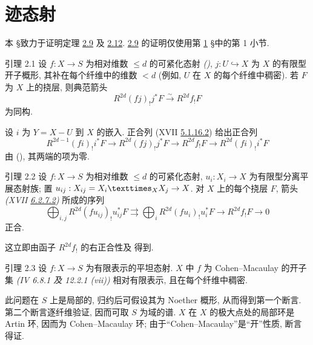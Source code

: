 \section{迹态射}\pageoriginale

本 \S 致力于证明定理 \hyperref[XVIII.thm2.9]{2.9} 及 \hyperref[XVIII.prop2.12]{2.12}. \hyperref[XVIII.thm2.9]{2.9} 的证明仅使用第 \hyperref[XVIII.sec1]{1} \S 中的第 1 小节.

\begin{enonce*}{引理 2.1}
设 $f:X\rightarrow S$ 为相对维数 $\leq d$ 的可紧化态射 \emph{()}, $j:U\hookrightarrow X$ 为 $X$ 的有限型开子概形, 其补在每个纤维中的维数 $< d$ (例如, $U$ 在 $X$ 的每个纤维中稠密). 若 $F$ 为 $X$ 上的挠层, 则典范箭头
$$
R^{2d}(fj)_{!}j^{\ast}F\xrightarrow{\sim} R^{2d}f_{!}F
$$
为同构.
\end{enonce*}

设 $i$ 为 $Y=X-U$ 到 $X$ 的嵌入. 正合列 (XVII \hyperref[XVII.eq5.1.16.2]{5.1.16.2}) 给出正合列
$$
R^{2d-1}(fi)_{!}i^{\ast}F\longrightarrow
R^{2d}(fj)_{!}j^{\ast}F\longrightarrow R^{2d}f_{!}F\longrightarrow
R^{2d}(fi)_{!}i^{\ast}F
$$
由 (), 其两端的项为零.

\begin{enonce*}{引理 2.2}
设 $f:X\rightarrow S$ 为相对维数 $\leq d$ 的可紧化态射, $u_{i}:X_{i}\rightarrow X$ 为有限型分离平展态射族; 置 $u_{ij}:X_{ij}=\fprod{X_{i}}{X_{j}}{X}\rightarrow X$. 对 $X$ 上的每个挠层 $F$, 箭头 \emph{(XVII \hyperref[XVII.eq6.2.7.2]{6.2.7.2})} 所成的序列
$$
\bigoplus_{i,j} R^{2d}(fu_{ij})_{!}u^{\ast}_{ij}F\rightrightarrows
\bigoplus_{i} R^{2d}(fu_{i})_{!}u^{\ast}_{i}F\rightarrow
R^{2d}f_{!}F\rightarrow 0
$$
正合.
\end{enonce*}

这立即由函子 $R^{2d}f_{!}$ 的右正合性及  得到.

\begin{enonce*}{引理 2.3}
设 $f:X\rightarrow S$ 为有限表示的平坦态射. $X$ 中 $f$ 为 Cohen--Macaulay 的开子集 \emph{(\EGA IV 6.8.1 及 12.2.1 (vii))} 相对有限表示, 且在每个纤维中稠密.
\end{enonce*}

此\pageoriginale 问题在 $S$ 上是局部的, 归约后可假设其为 Noether 概形, 从而得到第一个断言. 第二个断言逐纤维验证, 因而可取 $S$ 为域的谱. $X$ 在 $X$ 的极大点处的局部环是 Artin 环, 因而为 Cohen--Macaulay 环; 由于“Cohen--Macaulay”是“开”性质, 断言得证.


